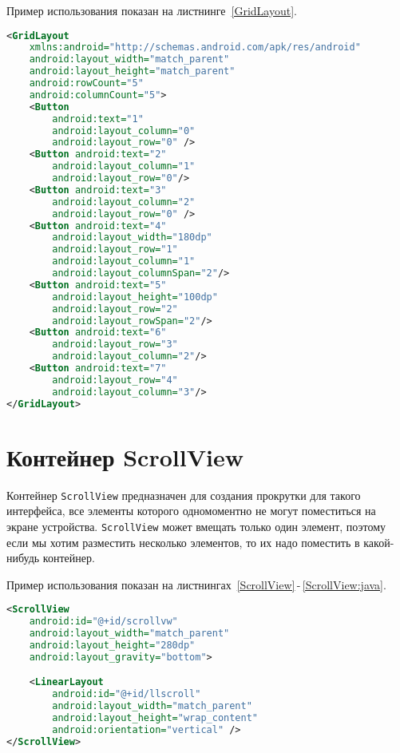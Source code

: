 Пример использования показан на листнинге~\ref{GridLayout}.

\begin{lstlisting}[language=XML
	, caption=\leftline{Программное создание GridLayout}
	, label=GridLayout
	]
<GridLayout
	xmlns:android="http://schemas.android.com/apk/res/android"
    android:layout_width="match_parent"
    android:layout_height="match_parent"
    android:rowCount="5"
    android:columnCount="5">
    <Button
        android:text="1"
        android:layout_column="0"
        android:layout_row="0" />
    <Button android:text="2"
        android:layout_column="1"
        android:layout_row="0"/>
    <Button android:text="3"
        android:layout_column="2"
        android:layout_row="0" />
    <Button android:text="4"
        android:layout_width="180dp"
        android:layout_row="1"
        android:layout_column="1"
        android:layout_columnSpan="2"/>
    <Button android:text="5"
        android:layout_height="100dp"
        android:layout_row="2"
        android:layout_rowSpan="2"/>
    <Button android:text="6"
        android:layout_row="3"
        android:layout_column="2"/>
    <Button android:text="7"
        android:layout_row="4"
        android:layout_column="3"/>
</GridLayout>
\end{lstlisting}

\section{Контейнер ScrollView}
Контейнер \texttt{ScrollView} предназначен для создания прокрутки для такого 
интерфейса, все элементы которого одномоментно не могут поместиться на 
экране устройства. \texttt{ScrollView} может вмещать только один элемент,
поэтому если мы хотим разместить несколько элементов, то их надо поместить в 
какой-нибудь контейнер.

Пример использования показан на
листнингах~\ref{ScrollView}\,-\,\ref{ScrollView:java}.

\begin{lstlisting}[language=XML
	, caption=\leftline{Программное создание ScrollView}
	, label=ScrollView
	]
<ScrollView
	android:id="@+id/scrollvw"
	android:layout_width="match_parent"
	android:layout_height="280dp"
	android:layout_gravity="bottom">

	<LinearLayout
		android:id="@+id/llscroll"
		android:layout_width="match_parent"
		android:layout_height="wrap_content"
		android:orientation="vertical" />
</ScrollView>
\end{lstlisting}

